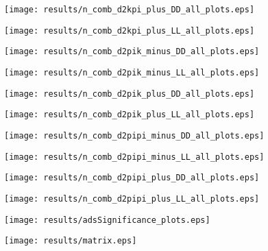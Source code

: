 \documentclass[11pt,a4paper]{article}
\begin{document}
\texttt{[image: results/n\_comb\_d2kpi\_plus\_DD\_all\_plots.eps]}

\texttt{[image: results/n\_comb\_d2kpi\_plus\_LL\_all\_plots.eps]}

\texttt{[image: results/n\_comb\_d2pik\_minus\_DD\_all\_plots.eps]}

\texttt{[image: results/n\_comb\_d2pik\_minus\_LL\_all\_plots.eps]}

\texttt{[image: results/n\_comb\_d2pik\_plus\_DD\_all\_plots.eps]}

\texttt{[image: results/n\_comb\_d2pik\_plus\_LL\_all\_plots.eps]}

\texttt{[image: results/n\_comb\_d2pipi\_minus\_DD\_all\_plots.eps]}

\texttt{[image: results/n\_comb\_d2pipi\_minus\_LL\_all\_plots.eps]}

\texttt{[image: results/n\_comb\_d2pipi\_plus\_DD\_all\_plots.eps]}

\texttt{[image: results/n\_comb\_d2pipi\_plus\_LL\_all\_plots.eps]}
\fi

\texttt{[image: results/adsSignificance\_plots.eps]}


\clearpage
\texttt{[image: results/matrix.eps]}
\end{document}
